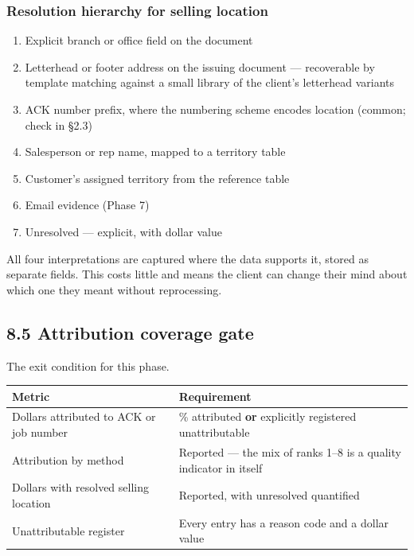\documentclass[
]{article}
\newcounter{none} %
\providecommand{\tightlist}{%
  \setlength{\itemsep}{0pt}\setlength{\parskip}{0pt}}
\begin{document}
\subsubsection{Resolution hierarchy for selling
location}\label{resolution-hierarchy-for-selling-location}

\begin{enumerate}
\def\labelenumi{\arabic{enumi}.}
\tightlist
\item
  Explicit branch or office field on the document
\item
  Letterhead or footer address on the issuing document --- recoverable
  by template matching against a small library of the client's
  letterhead variants
\item
  ACK number prefix, where the numbering scheme encodes location
  (common; check in §2.3)
\item
  Salesperson or rep name, mapped to a territory table
\item
  Customer's assigned territory from the reference table
\item
  Email evidence (Phase 7)
\item
  Unresolved --- explicit, with dollar value
\end{enumerate}

All four interpretations are captured where the data supports it, stored
as separate fields. This costs little and means the client can change
their mind about which one they meant without reprocessing.

\subsection{8.5 Attribution coverage
gate}\label{attribution-coverage-gate}

The exit condition for this phase.

{\def\LTcaptype{none} %
\begin{longtable}[]{@{}
  >{\raggedright\arraybackslash}p{}
  >{\raggedright\arraybackslash}p{}@{}}
\toprule\noalign{}
\begin{minipage}[b]{\linewidth}\raggedright
Metric
\end{minipage} & \begin{minipage}[b]{\linewidth}\raggedright
Requirement
\end{minipage} \\
\midrule\noalign{}
\endhead
\bottomrule\noalign{}
\endlastfoot
Dollars attributed to ACK or job number & 100\% attributed \textbf{or}
explicitly registered unattributable \\
Attribution by method & Reported --- the mix of ranks 1--8 is a quality
indicator in itself \\
Dollars with resolved selling location & Reported, with unresolved
quantified \\
Unattributable register & Every entry has a reason code and a dollar
value \\
\end{longtable}
}
\end{document}
